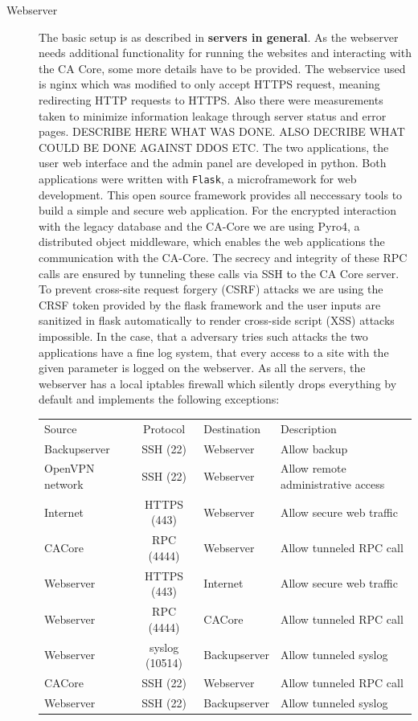 \documentclass[a4paper, toc=index, 12pt, DIV14, twoside, BCOR2cm, headsepline, numbers=noenddot, bibliography=totoc]{scrbook}
\begin{document}
\begin{description}
\item[Webserver ] The basic setup is as described in {\bfseries servers in general}. As the webserver needs additional functionality for running the websites and interacting with the CA Core, some more details have to be provided.\newline
The webservice used is nginx which was modified to only accept HTTPS request, meaning redirecting HTTP requests to HTTPS. Also there were measurements taken to minimize information leakage through server status and error pages. DESCRIBE HERE WHAT WAS DONE. ALSO DECRIBE WHAT COULD BE DONE AGAINST DDOS ETC.\newline
The two applications, the user web interface and the admin panel are developed in python. Both applications were written with  \texttt{Flask}, a microframework for web development. This open source framework provides all neccessary tools to build a simple and secure web application. For the encrypted interaction with the legacy database and the CA-Core we are using Pyro4, a distributed object middleware, which enables the web applications the communication with the CA-Core. The secrecy and integrity of these RPC calls are ensured by tunneling these calls via SSH to the CA Core server.\newline
To prevent cross-site request forgery (CSRF) attacks we are using the CRSF token provided by the flask framework and the user inputs are sanitized in flask automatically to render cross-side script (XSS) attacks impossible.\newline
In the case, that a adversary tries such attacks the two applications have a fine log system, that every access to a site with the given parameter is logged on the webserver. \newline
As all the servers, the webserver has a local iptables firewall which silently drops everything by default and implements the following exceptions:\newline
\begin{tabular}{p{2.5cm} c l p{4.5cm}}
Source & Protocol & Destination & Description\\
\cline{1-4}
Backupserver & SSH (22) & Webserver & Allow backup\\
\cline{1-4}
OpenVPN network & SSH (22) & Webserver & Allow remote administrative access \\
\cline{1-4}
Internet & HTTPS (443) & Webserver & Allow secure web traffic\\
\cline{1-4}
CACore & RPC (4444) & Webserver & Allow tunneled RPC call\\
\cline{1-4}
Webserver & HTTPS (443) & Internet & Allow secure web traffic\\
\cline{1-4}
Webserver & RPC (4444) &  CACore& Allow tunneled RPC call\\
\cline{1-4}
Webserver & syslog (10514) & Backupserver & Allow tunneled syslog\\
\cline{1-4}
CACore & SSH (22) & Webserver & Allow tunneled RPC call\\
\cline{1-4}
Webserver & SSH (22) & Backupserver & Allow tunneled syslog\\
\end{tabular}


\end{description}
\end{document}
